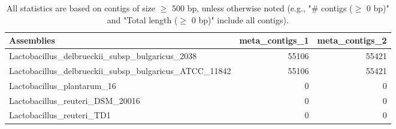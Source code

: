 \documentclass[12pt,a4paper]{article}
\begin{document}
\begin{table}[ht]
\begin{center}
\caption{All statistics are based on contigs of size $\geq$ 500 bp, unless otherwise noted (e.g., "\# contigs ($\geq$ 0 bp)" and "Total length ($\geq$ 0 bp)" include all contigs).}
\begin{tabular}{|l*{2}{|r}|}
\hline
Assemblies & meta\_contigs\_1 & meta\_contigs\_2 \\ \hline
Lactobacillus\_delbrueckii\_subsp\_bulgaricus\_2038 & 55106 & 55421 \\ \hline
Lactobacillus\_delbrueckii\_subsp\_bulgaricus\_ATCC\_11842 & 55106 & 55421 \\ \hline
Lactobacillus\_plantarum\_16 & 0 & 0 \\ \hline
Lactobacillus\_reuteri\_DSM\_20016 & 0 & 0 \\ \hline
Lactobacillus\_reuteri\_TD1 & 0 & 0 \\ \hline
\end{tabular}
\end{center}
\end{table}
\end{document}
